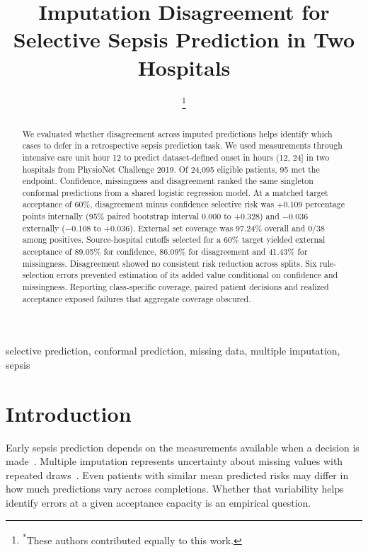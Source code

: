 \documentclass[conference]{IEEEtran}
\begin{document}
\title{Imputation Disagreement for Selective Sepsis Prediction in Two Hospitals}

\author{
\thanks{\textsuperscript{*}These authors contributed equally to this work.}}

\maketitle

\begin{abstract}
We evaluated whether disagreement across imputed predictions helps identify which cases to defer in a retrospective sepsis prediction task. We used measurements through intensive care unit hour 12 to predict dataset-defined onset in hours (12, 24] in two hospitals from PhysioNet Challenge 2019. Of 24,095 eligible patients, 95 met the endpoint. Confidence, missingness and disagreement ranked the same singleton conformal predictions from a shared logistic regression model. At a matched target acceptance of 60\%, disagreement minus confidence selective risk was +0.109 percentage points internally (95\% paired bootstrap interval 0.000 to +0.328) and $-$0.036 externally ($-$0.108 to +0.036). External set coverage was 97.24\% overall and 0/38 among positives. Source-hospital cutoffs selected for a 60\% target yielded external acceptance of 89.05\% for confidence, 86.09\% for disagreement and 41.43\% for missingness. Disagreement showed no consistent risk reduction across splits. Six rule-selection errors prevented estimation of its added value conditional on confidence and missingness. Reporting class-specific coverage, paired patient decisions and realized acceptance exposed failures that aggregate coverage obscured.
\end{abstract}

\begin{IEEEkeywords}
selective prediction, conformal prediction, missing data, multiple imputation, sepsis
\end{IEEEkeywords}

\section{Introduction}

Early sepsis prediction depends on the measurements available when a decision is made~\cite{reyna2020}. Multiple imputation represents uncertainty about missing values with repeated draws~\cite{rubin1987,vanbuuren2011}. Even patients with similar mean predicted risks may differ in how much predictions vary across completions. Whether that variability helps identify errors at a given acceptance capacity is an empirical question.
\end{document}
